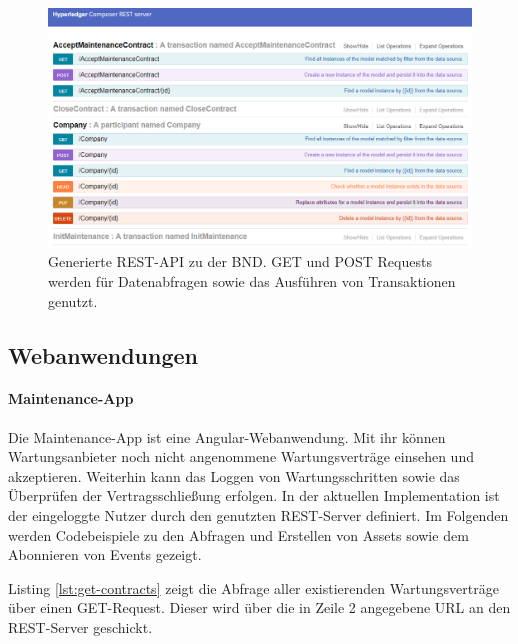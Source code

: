 \begin{figure}[!htbp]
    \centering
      \includegraphics[width=1.0\textwidth,angle=0]{images/rest-api}
       \caption{Generierte REST-API zu der \acs{BND}. GET und POST Requests werden für Datenabfragen sowie das Ausführen von Transaktionen genutzt.}
      \label{fig:rest-api}
\end{figure}

\subsection{Webanwendungen}

\paragraph{Maintenance-App}

Die Maintenance-App ist eine Angular-Webanwendung. Mit ihr können Wartungsanbieter noch nicht angenommene Wartungsverträge einsehen und akzeptieren. Weiterhin kann das Loggen von Wartungsschritten sowie das Überprüfen der Vertragsschließung erfolgen. In der aktuellen Implementation ist der eingeloggte Nutzer durch den genutzten REST-Server definiert. Im Folgenden werden Codebeispiele zu den Abfragen und Erstellen von Assets sowie dem Abonnieren von Events gezeigt.

Listing \ref{lst:get-contracts} zeigt die Abfrage aller existierenden Wartungsverträge über einen GET-Request. Dieser wird über die in Zeile 2 angegebene URL an den REST-Server geschickt.


